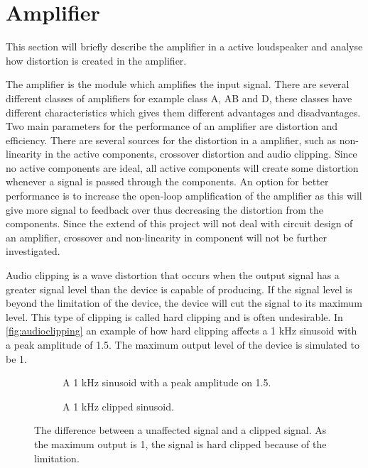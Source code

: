 \section{Amplifier}
This section will briefly describe the amplifier in a active loudspeaker and analyse how distortion is created in the amplifier.

The amplifier is the module which amplifies the input signal. There are several different classes of amplifiers for example class A, AB and D, these classes have different characteristics which gives them different advantages and disadvantages. Two main parameters for the performance of an amplifier are distortion and efficiency. There are several sources for the distortion in a amplifier, such as non-linearity in the active components, crossover distortion and audio clipping. Since no active components are ideal, all active components will create some distortion whenever a signal is passed through the components. An option for better performance is to increase the open-loop amplification of the amplifier as this will give more signal to feedback over thus decreasing the distortion from the components. Since the extend of this project will not deal with circuit design of an amplifier, crossover and non-linearity in component will not be further investigated.

Audio clipping is a wave distortion that occurs when the output signal has a greater signal level than the device is capable of producing. If the signal level is beyond the limitation of the device, the device will cut the signal to its maximum level. This type of clipping is called hard clipping and is often undesirable. In \autoref{fig:audioclipping} an example of how hard clipping affects a 1 kHz sinusoid with a peak amplitude of 1.5. The maximum output level of the device is simulated to be 1.

\begin{figure}[H]
\centering
\begin{subfigure}[t]{0.47\textwidth}
	
	\caption{A 1 kHz sinusoid with a peak amplitude on 1.5.}
	\label{fig:clippingClean}
\end{subfigure}
\hspace{6mm} 
\begin{subfigure}[t]{0.47\textwidth}
	
	\caption{A 1 kHz clipped sinusoid.}
	\label{fig:clippingDist}
\end{subfigure}
\caption{The difference between a unaffected signal and a clipped signal. As the maximum output is 1, the signal is hard clipped because of the limitation.}
\label{fig:audioclipping}
\end{figure}

